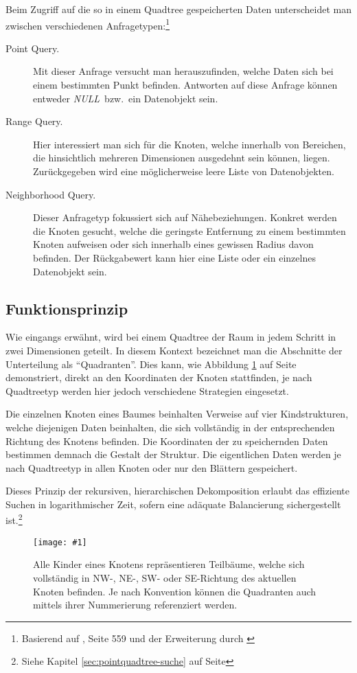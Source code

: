 \documentclass[%
			fontsize=12pt,%
			paper=a4,%
			DIV11,
			liststotoc,
			bibtotoc,
			draft=false,%
			titlepage
			]{scrartcl}
\newcommand{\mynull}{\textit{NULL}}
\newcommand{\myfig}[5] {
 \begin{figure}[tbph]
	 \centering
	 \texttt{[image: \#1]}
	 \caption[#4]{#5}
	 \label{fig:#2}
 \end{figure}
}
\begin{document}
Beim Zugriff auf die so in einem Quadtree gespeicherten Daten unterscheidet man zwischen verschiedenen Anfragetypen:\footnote{Basierend auf \cite{Knuth:1998:ACP:280635}, Seite 559 und der Erweiterung durch \cite{Bentley:1975:nearest}}
\begin{description}
	\item[Point Query.]
		Mit dieser Anfrage versucht man herauszufinden, welche Daten sich bei einem bestimmten Punkt befinden.
		Antworten auf diese Anfrage können entweder \mynull\ bzw.\ ein Datenobjekt sein.
	\item[Range Query.]
		Hier interessiert man sich für die Knoten, welche innerhalb von Bereichen, die hinsichtlich mehreren Dimensionen ausgedehnt sein können, liegen.
		Zurückgegeben wird eine möglicherweise leere Liste von Datenobjekten.
	\item[Neighborhood Query.]
		Dieser Anfragetyp fokussiert sich auf Nähebeziehungen.
		Konkret werden die Knoten gesucht, welche die geringste Entfernung zu einem bestimmten Knoten aufweisen oder sich innerhalb eines gewissen Radius davon befinden.
		Der Rückgabewert kann hier eine Liste oder ein einzelnes Datenobjekt sein.
\end{description}


\subsection{Funktionsprinzip}

Wie eingangs erwähnt, wird bei einem Quadtree der Raum in jedem Schritt in zwei Dimensionen geteilt.
In diesem Kontext bezeichnet man die Abschnitte der Unterteilung als "`Quadranten"'.
Dies kann, wie Abbildung \ref{fig:quadtree} auf Seite \pageref{fig:quadtree} demonstriert, direkt an den Koordinaten der Knoten stattfinden, je nach Quadtreetyp werden hier jedoch verschiedene Strategien eingesetzt.

Die einzelnen Knoten eines Baumes beinhalten Verweise auf vier Kindstrukturen, welche diejenigen Daten beinhalten, die sich vollständig in der entsprechenden Richtung des Knotens befinden. 
Die Koordinaten der zu speichernden Daten bestimmen demnach die Gestalt der Struktur.
Die eigentlichen Daten werden je nach Quadtreetyp in allen Knoten oder nur den Blättern gespeichert.

Dieses Prinzip der rekursiven, hierarchischen Dekomposition erlaubt das effiziente Suchen in logarithmischer Zeit, sofern eine adäquate Balancierung sichergestellt ist.\footnote{Siehe Kapitel \ref{sec:pointquadtree-suche} auf Seite \pageref{sec:pointquadtree-suche}}
\myfig{img/quadtree}{quadtree}{width=.4\textwidth}{Funktionsprinzip eines Quadtrees}{Alle Kinder eines Knotens repräsentieren Teilbäume, welche sich vollständig in NW-, NE-, \mbox{SW-} oder SE-Richtung des aktuellen Knoten befinden. Je nach Konvention können die Quadranten auch mittels ihrer Nummerierung referenziert werden.}
\end{document}
